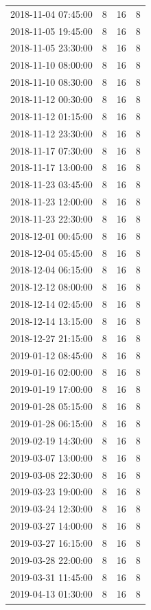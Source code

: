 \begin{tabular}{lrrr}
2018-11-04 07:45:00 & 8 & 16 & 8 \\
2018-11-05 19:45:00 & 8 & 16 & 8 \\
2018-11-05 23:30:00 & 8 & 16 & 8 \\
2018-11-10 08:00:00 & 8 & 16 & 8 \\
2018-11-10 08:30:00 & 8 & 16 & 8 \\
2018-11-12 00:30:00 & 8 & 16 & 8 \\
2018-11-12 01:15:00 & 8 & 16 & 8 \\
2018-11-12 23:30:00 & 8 & 16 & 8 \\
2018-11-17 07:30:00 & 8 & 16 & 8 \\
2018-11-17 13:00:00 & 8 & 16 & 8 \\
2018-11-23 03:45:00 & 8 & 16 & 8 \\
2018-11-23 12:00:00 & 8 & 16 & 8 \\
2018-11-23 22:30:00 & 8 & 16 & 8 \\
2018-12-01 00:45:00 & 8 & 16 & 8 \\
2018-12-04 05:45:00 & 8 & 16 & 8 \\
2018-12-04 06:15:00 & 8 & 16 & 8 \\
2018-12-12 08:00:00 & 8 & 16 & 8 \\
2018-12-14 02:45:00 & 8 & 16 & 8 \\
2018-12-14 13:15:00 & 8 & 16 & 8 \\
2018-12-27 21:15:00 & 8 & 16 & 8 \\
2019-01-12 08:45:00 & 8 & 16 & 8 \\
2019-01-16 02:00:00 & 8 & 16 & 8 \\
2019-01-19 17:00:00 & 8 & 16 & 8 \\
2019-01-28 05:15:00 & 8 & 16 & 8 \\
2019-01-28 06:15:00 & 8 & 16 & 8 \\
2019-02-19 14:30:00 & 8 & 16 & 8 \\
2019-03-07 13:00:00 & 8 & 16 & 8 \\
2019-03-08 22:30:00 & 8 & 16 & 8 \\
2019-03-23 19:00:00 & 8 & 16 & 8 \\
2019-03-24 12:30:00 & 8 & 16 & 8 \\
2019-03-27 14:00:00 & 8 & 16 & 8 \\
2019-03-27 16:15:00 & 8 & 16 & 8 \\
2019-03-28 22:00:00 & 8 & 16 & 8 \\
2019-03-31 11:45:00 & 8 & 16 & 8 \\
2019-04-13 01:30:00 & 8 & 16 & 8 \\

\end{tabular}
